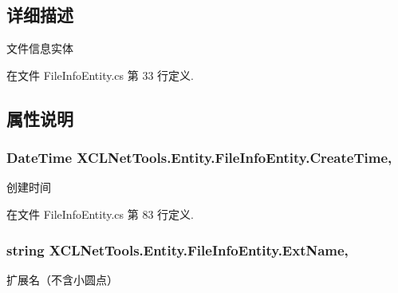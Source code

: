 \subsection{详细描述}
文件信息实体 



在文件 File\-Info\-Entity.\-cs 第 33 行定义.



\subsection{属性说明}
\hypertarget{class_x_c_l_net_tools_1_1_entity_1_1_file_info_entity_a93fc7b2a3119885d9449d1817e7306ca}{
\subsubsection[{Create\-Time}]{\setlength{\rightskip}{0pt plus 5cm}Date\-Time X\-C\-L\-Net\-Tools.\-Entity.\-File\-Info\-Entity.\-Create\-Time\hspace{0.3cm}{\ttfamily [get]}, {\ttfamily [set]}}}\label{class_x_c_l_net_tools_1_1_entity_1_1_file_info_entity_a93fc7b2a3119885d9449d1817e7306ca}


创建时间 



在文件 File\-Info\-Entity.\-cs 第 83 行定义.

\hypertarget{class_x_c_l_net_tools_1_1_entity_1_1_file_info_entity_a46ccaf5dbcc1154782c0227c83eb54e4}{
\subsubsection[{Ext\-Name}]{\setlength{\rightskip}{0pt plus 5cm}string X\-C\-L\-Net\-Tools.\-Entity.\-File\-Info\-Entity.\-Ext\-Name\hspace{0.3cm}{\ttfamily [get]}, {\ttfamily [set]}}}\label{class_x_c_l_net_tools_1_1_entity_1_1_file_info_entity_a46ccaf5dbcc1154782c0227c83eb54e4}


扩展名（不含小圆点） 



